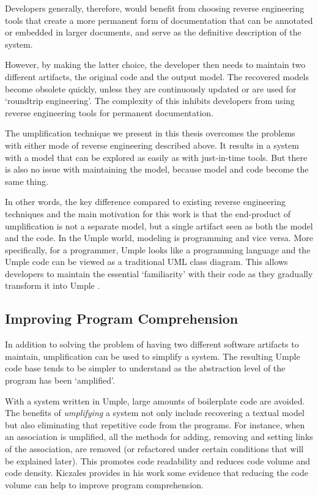 Developers generally, therefore, would benefit from choosing reverse engineering tools that create a more permanent form of documentation that can be annotated or embedded in larger documents, and serve as the definitive description of the system. 

However, by making the latter choice, the developer then needs to maintain two different artifacts, the original code and the output model. The recovered models become obsolete quickly, unless they are continuously updated or are used for `roundtrip engineering'.  The complexity of this inhibits developers from using reverse engineering tools for permanent documentation.

The umplification technique we present in this thesis overcomes the problems with either mode of reverse engineering described above. It results in a system with a model that can be explored as easily as with just-in-time tools. But there is also no issue with maintaining the model, because model and code become the same thing.

In other words, the key difference compared to existing reverse engineering techniques and the main motivation for this work is that the end-product of umplification is not a separate model, but a single artifact seen as both the model and the code. In the Umple world, modeling is programming and vice versa. More specifically, for a programmer, Umple looks like a programming language and the Umple code can be viewed as a traditional UML class diagram. This allows developers to maintain the essential `familiarity' with their code as they gradually transform it into Umple \cite{Forward2008}. 

\subsection{Improving Program Comprehension}

In addition to solving the problem of having two different software artifacts to maintain,   umplification can be used to simplify a system. The resulting Umple code base tends to be simpler to understand \cite{UmpleMAIN} as the abstraction level of the program has been `amplified'.

With a system written in Umple, large amounts of boilerplate code are avoided. The benefits of \textit{umplifying} a system not only include recovering a textual model but also eliminating that repetitive code from the programs. For instance, when an association is umplified, all the methods for adding, removing and setting links of the association, are removed (or refactored under certain conditions that will be explained later). This promotes code readability and reduces code volume and code density. Kiczales provides in his work \cite{kiczalesAOP} some evidence that reducing the code volume can help to improve program comprehension.

